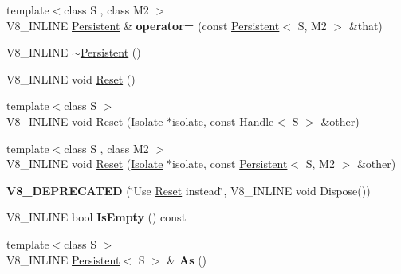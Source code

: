 \begin{DoxyCompactItemize}
\item 
\hypertarget{classv8_1_1_persistent_a11104ee8739cb1f25e40fd17d746b48f}{}{\footnotesize template$<$class S , class M2 $>$ }\\V8\+\_\+\+I\+N\+L\+I\+N\+E \hyperlink{classv8_1_1_persistent}{Persistent} \& {\bfseries operator=} (const \hyperlink{classv8_1_1_persistent}{Persistent}$<$ S, M2 $>$ \&that)\label{classv8_1_1_persistent_a11104ee8739cb1f25e40fd17d746b48f}

\item 
V8\+\_\+\+I\+N\+L\+I\+N\+E \hyperlink{classv8_1_1_persistent_a7d4d2bebfe3919e447e22adc15464e25}{$\sim$\+Persistent} ()
\item 
V8\+\_\+\+I\+N\+L\+I\+N\+E void \hyperlink{classv8_1_1_persistent_a5912223c89179157015246728223c051}{Reset} ()
\item 
{\footnotesize template$<$class S $>$ }\\V8\+\_\+\+I\+N\+L\+I\+N\+E void \hyperlink{classv8_1_1_persistent_a415a9da7e5a5b89de59503b3619e0358}{Reset} (\hyperlink{classv8_1_1_isolate}{Isolate} $\ast$isolate, const \hyperlink{classv8_1_1_handle}{Handle}$<$ S $>$ \&other)
\item 
{\footnotesize template$<$class S , class M2 $>$ }\\V8\+\_\+\+I\+N\+L\+I\+N\+E void \hyperlink{classv8_1_1_persistent_a276ec37d0314920f811619edc2344736}{Reset} (\hyperlink{classv8_1_1_isolate}{Isolate} $\ast$isolate, const \hyperlink{classv8_1_1_persistent}{Persistent}$<$ S, M2 $>$ \&other)
\item 
\hypertarget{classv8_1_1_persistent_aced3795228cff3439e80a83de63248a7}{}{\bfseries V8\+\_\+\+D\+E\+P\+R\+E\+C\+A\+T\+E\+D} (\char`\"{}Use \hyperlink{classv8_1_1_persistent_a5912223c89179157015246728223c051}{Reset} instead\char`\"{}, V8\+\_\+\+I\+N\+L\+I\+N\+E void Dispose())\label{classv8_1_1_persistent_aced3795228cff3439e80a83de63248a7}

\item 
\hypertarget{classv8_1_1_persistent_ac98fb0185b3800b9d18d3b8927e73fcd}{}V8\+\_\+\+I\+N\+L\+I\+N\+E bool {\bfseries Is\+Empty} () const \label{classv8_1_1_persistent_ac98fb0185b3800b9d18d3b8927e73fcd}

\item 
\hypertarget{classv8_1_1_persistent_a8d2c96e559ac88f6201d98cb2a626808}{}{\footnotesize template$<$class S $>$ }\\V8\+\_\+\+I\+N\+L\+I\+N\+E \hyperlink{classv8_1_1_persistent}{Persistent}$<$ S $>$ \& {\bfseries As} ()\label{classv8_1_1_persistent_a8d2c96e559ac88f6201d98cb2a626808}


\end{DoxyCompactItemize}
